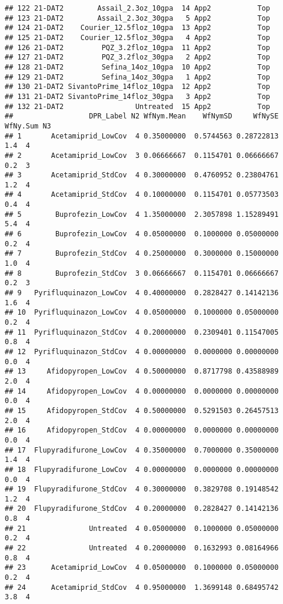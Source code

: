 \documentclass[
]{article}
\begin{document}
\begin{verbatim}
## 122 21-DAT2        Assail_2.3oz_10gpa  14 App2           Top
## 123 21-DAT2        Assail_2.3oz_30gpa   5 App2           Top
## 124 21-DAT2    Courier_12.5floz_10gpa  13 App2           Top
## 125 21-DAT2    Courier_12.5floz_30gpa   4 App2           Top
## 126 21-DAT2         PQZ_3.2floz_10gpa  11 App2           Top
## 127 21-DAT2         PQZ_3.2floz_30gpa   2 App2           Top
## 128 21-DAT2         Sefina_14oz_10gpa  10 App2           Top
## 129 21-DAT2         Sefina_14oz_30gpa   1 App2           Top
## 130 21-DAT2 SivantoPrime_14floz_10gpa  12 App2           Top
## 131 21-DAT2 SivantoPrime_14floz_30gpa   3 App2           Top
## 132 21-DAT2                 Untreated  15 App2           Top
##                  DPR_Label N2 WfNym.Mean    WfNymSD     WfNySE WfNy.Sum N3
## 1       Acetamiprid_LowCov  4 0.35000000  0.5744563 0.28722813      1.4  4
## 2       Acetamiprid_LowCov  3 0.06666667  0.1154701 0.06666667      0.2  3
## 3       Acetamiprid_StdCov  4 0.30000000  0.4760952 0.23804761      1.2  4
## 4       Acetamiprid_StdCov  4 0.10000000  0.1154701 0.05773503      0.4  4
## 5        Buprofezin_LowCov  4 1.35000000  2.3057898 1.15289491      5.4  4
## 6        Buprofezin_LowCov  4 0.05000000  0.1000000 0.05000000      0.2  4
## 7        Buprofezin_StdCov  4 0.25000000  0.3000000 0.15000000      1.0  4
## 8        Buprofezin_StdCov  3 0.06666667  0.1154701 0.06666667      0.2  3
## 9   Pyrifluquinazon_LowCov  4 0.40000000  0.2828427 0.14142136      1.6  4
## 10  Pyrifluquinazon_LowCov  4 0.05000000  0.1000000 0.05000000      0.2  4
## 11  Pyrifluquinazon_StdCov  4 0.20000000  0.2309401 0.11547005      0.8  4
## 12  Pyrifluquinazon_StdCov  4 0.00000000  0.0000000 0.00000000      0.0  4
## 13     Afidopyropen_LowCov  4 0.50000000  0.8717798 0.43588989      2.0  4
## 14     Afidopyropen_LowCov  4 0.00000000  0.0000000 0.00000000      0.0  4
## 15     Afidopyropen_StdCov  4 0.50000000  0.5291503 0.26457513      2.0  4
## 16     Afidopyropen_StdCov  4 0.00000000  0.0000000 0.00000000      0.0  4
## 17  Flupyradifurone_LowCov  4 0.35000000  0.7000000 0.35000000      1.4  4
## 18  Flupyradifurone_LowCov  4 0.00000000  0.0000000 0.00000000      0.0  4
## 19  Flupyradifurone_StdCov  4 0.30000000  0.3829708 0.19148542      1.2  4
## 20  Flupyradifurone_StdCov  4 0.20000000  0.2828427 0.14142136      0.8  4
## 21               Untreated  4 0.05000000  0.1000000 0.05000000      0.2  4
## 22               Untreated  4 0.20000000  0.1632993 0.08164966      0.8  4
## 23      Acetamiprid_LowCov  4 0.05000000  0.1000000 0.05000000      0.2  4
## 24      Acetamiprid_StdCov  4 0.95000000  1.3699148 0.68495742      3.8  4

\end{verbatim}
\end{document}
